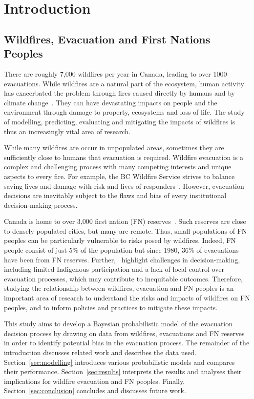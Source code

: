 \section{Introduction}\label{sec:introduction}
\subsection{Wildfires, Evacuation and First Nations Peoples}\label{sec:wildfires_and_evacuation}

There are roughly 7,000 wildfires per year in Canada, leading to over 1000 evacuations. While wildfires are a natural part of the ecosystem, human activity has exacerbated the problem through fires caused directly by humans and by climate change~\cite{cwfis_summary}. They can have devastating impacts on people and the environment through damage to property, ecosystems and loss of life. The study of modelling, predicting, evaluating and mitigating the impacts of wildfires is thus an increasingly vital area of research.

While many wildfires are occur in unpopulated areas, sometimes they are sufficiently close to humans that evacuation is required. Wildfire evacuation is a complex and challenging process with many competing interests and unique aspects to every fire. For example, the BC Wildfire Service strives to balance saving lives and damage with risk and lives of responders~\cite{bcgov_evacuation_process}. However, evacuation decisions are inevitably subject to the flaws and bias of every institutional decision-making process. 

Canada is home to over 3,000 first nation (FN) reserves~\cite{reservesdb}. Such reserves are close to densely populated cities, but many are remote. Thus, small populations of FN peoples can be particularly vulnerable to risks posed by wildfires. Indeed, FN people consist of just 5\% of the population but since 1980, 36\% of evacuations have been from FN reserves. Further,~\citet{management_evacuation_review} highlight challenges in decision-making, including limited Indigenous participation and a lack of local control over evacuation processes, which may contribute to inequitable outcomes. Therefore, studying the relationship between wildfires, evacuation and FN peoples is an important area of research to understand the risks and impacts of wildfires on FN peoples, and to inform policies and practices to mitigate these impacts.

This study aims to develop a Bayesian probabilistic model of the evacuation decision process by drawing on data from wildfires, evacuations and FN reserves in order to identify potential bias in the evacuation process. The remainder of the introduction discusses related work and describes the data used. Section~\ref{sec:modelling} introduces various probabilistic models and compares their performance. Section~\ref{sec:results} interprets the results and analyses their implications for wildfire evacuation and FN peoples. Finally, Section~\ref{sec:conclusion} concludes and discusses future work. 

